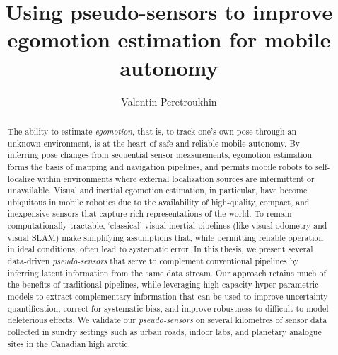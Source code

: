 \documentclass[oneandahalfspaced,twoside,12pt]{ut-thesis}
\author{Valentin Peretroukhin}
\title{Using pseudo-sensors to improve egomotion estimation for mobile autonomy}
\begin{document}
\begin{preliminary}

\maketitle


\begin{abstract}
The ability to estimate \textit{egomotion}, that is, to track one's own pose through an unknown environment, is at the heart of safe and reliable mobile autonomy. By inferring pose changes from sequential sensor measurements, egomotion estimation forms the basis of mapping and navigation pipelines, and permits mobile robots to self-localize within environments where external localization sources are intermittent or unavailable. 
Visual and inertial egomotion estimation, in particular, have become ubiquitous in mobile robotics due to the availability of high-quality, compact, and inexpensive sensors that capture rich representations of the world.
 To remain computationally tractable, `classical' visual-inertial pipelines (like visual odometry and visual SLAM) make simplifying assumptions that, while permitting reliable operation in ideal conditions, often lead to systematic error. In this thesis, we present several data-driven \textit{pseudo-sensors} that serve to complement conventional pipelines by inferring latent information from the same data stream. Our approach retains much of the benefits of traditional pipelines, while leveraging high-capacity hyper-parametric models to extract complementary information that can be used to improve uncertainty quantification, correct for systematic bias, and improve robustness to difficult-to-model deleterious effects.
We validate our \textit{pseudo-sensors} on several kilometres of sensor data collected in sundry settings such as urban roads, indoor labs, and planetary analogue sites in the Canadian high arctic.
\end{abstract}


\end{preliminary}
\end{document}
